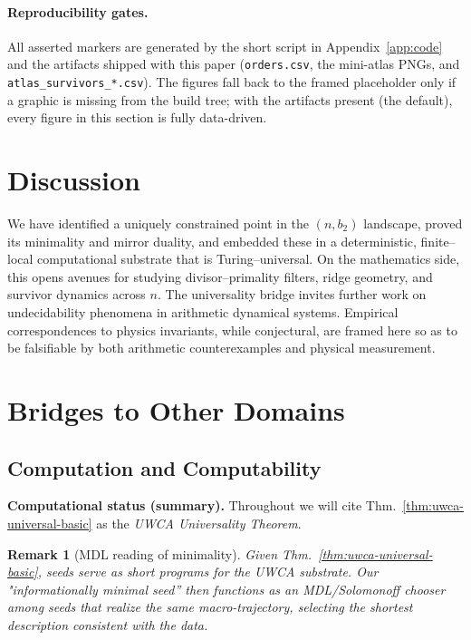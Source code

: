 \documentclass[12pt]{article}
\newtheorem{remark}[theorem]{Remark}
\numberwithin{equation}{section}
\begin{document}
\paragraph{Reproducibility gates.} All asserted markers are generated by the short script in Appendix~\ref{app:code} and the artifacts shipped with this paper (\texttt{orders.csv}, the mini-atlas PNGs, and \texttt{atlas\_survivors\_*.csv}). The figures fall back to the framed placeholder only if a graphic is missing from the build tree; with the artifacts present (the default), every figure in this section is fully data-driven.


\section{Discussion}
We have identified a uniquely constrained point in the $(n,b_2)$ landscape, proved its minimality and mirror duality, and embedded these in a deterministic, finite--local computational substrate that is Turing--universal.  On the mathematics side, this opens avenues for studying divisor--primality filters, ridge geometry, and survivor dynamics across $n$.  The universality bridge invites further work on undecidability phenomena in arithmetic dynamical systems.  Empirical correspondences to physics invariants, while conjectural, are framed here so as to be falsifiable by both arithmetic counterexamples and physical measurement.

\section{Bridges to Other Domains}\label{sec:bridges}

\subsection{Computation and Computability}\label{sec:comp-bridge}
\noindent\textbf{Computational status (summary).} Throughout we will cite Thm.~\ref{thm:uwca-universal-basic} as the \emph{UWCA Universality Theorem}.

\begin{remark}[MDL reading of minimality]\label{rem:mdl}
Given Thm.~\ref{thm:uwca-universal-basic}, seeds serve as short programs for the UWCA substrate. Our "informationally minimal seed'' then functions as an MDL/Solomonoff chooser among seeds that realize the same macro-trajectory, selecting the shortest description consistent with the data.
\end{remark}
\end{document}
